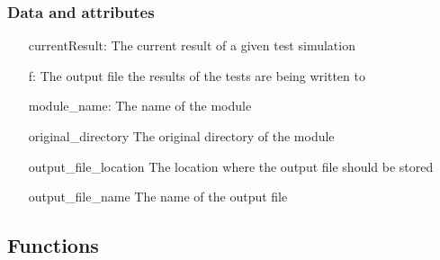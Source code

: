 \documentclass{asme2ej}
\begin{document}
\subsubsection{Data and attributes}
\begin{itemize}
\item [currentResult:]{The current result of a given test simulation}
\item [f:]{The output file the results of the tests are being written to}
\item [module\_name:]{The name of the module}
\item [original\_directory]{The original directory of the module}
\item [output\_file\_location]{The location where the output file should be stored}
\item [output\_file\_name]{The name of the output file}
\end{itemize}

\subsection{Functions}

\FloatBarrier



\end{document}

